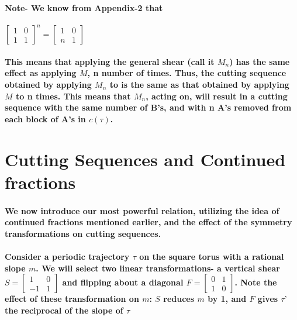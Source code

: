 \documentclass{report}
\begin{document}
\paragraph{Note- We know from Appendix-2 that }
$\begin{bmatrix} 1&0\\1&1 \end{bmatrix}^{n} = \begin{bmatrix} 1&0\\n&1 \end{bmatrix}$

\paragraph{This means that applying the general shear (call it $M_{n}$) has the same effect as applying $M$, n number of times. Thus, the cutting sequence obtained by applying $M_{n}$ to  is the same as that obtained by applying $M$ to n times. This means that $M_{n}$, acting on, will result in a cutting sequence with the same number of B’s, and with n A’s removed from each block of A’s in $c(\tau)$.}


\section{Cutting Sequences and Continued fractions}

\paragraph{We now introduce our most powerful relation, utilizing the idea of continued fractions mentioned earlier, and the effect of the symmetry transformations on cutting sequences.}

\paragraph{Consider a periodic trajectory $\tau$ on the square torus with a rational slope $m$. We will select two linear transformations- 
a vertical shear
$S=\begin{bmatrix}
1&0\\-1&1
\end{bmatrix}$
and flipping about a diagonal 
$F=\begin{bmatrix}
0&1\\1&0
\end{bmatrix}$.
Note the effect of these transformation on $m$: $S$ reduces $m$ by 1, and $F$ gives $\tau’$ the reciprocal of the slope of $\tau$}
\end{document}
